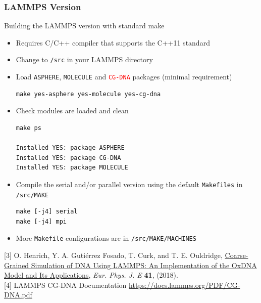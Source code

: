 \documentclass[slidestop,compress,9pt]{beamer}
\begin{document}
\begin{frame}[fragile]
\frametitle{LAMMPS Version}
\small Building the LAMMPS version with standard make
\begin{itemize}
\item Requires C/C++ compiler that supports the C++11 standard
\item Change to \texttt{/src} in your LAMMPS directory
\item Load \texttt{ASPHERE}, \texttt{MOLECULE} and \texttt{\textcolor{red}{CG-DNA}} packages (minimal requirement)\\
\linespread{0.4}
\begin{lstlisting}
make yes-asphere yes-molecule yes-cg-dna
\end{lstlisting}
\item Check modules are loaded and clean

\begin{lstlisting}
make ps

Installed YES: package ASPHERE
Installed YES: package CG-DNA
Installed YES: package MOLECULE
\end{lstlisting}

\item Compile the serial and/or parallel version using the default \texttt{Makefiles} in \texttt{/src/MAKE}
\begin{lstlisting}
make [-j4] serial
make [-j4] mpi
\end{lstlisting}
\item More \texttt{Makefile} configurations are in \texttt{/src/MAKE/MACHINES}
\end{itemize}
\linespread{1.0}\vspace*{0.25cm}
[3] O. Henrich, Y. A. Guti\'errez Fosado, T. Curk, and T. E. Ouldridge, \href{https://doi.org/10.1140/epje/i2018-11669-8}{Coarse-Grained Simulation of DNA Using LAMMPS: An Implementation of the OxDNA Model and Its Applications}, \textit{Eur. Phys. J. E} \textbf{41}, (2018).\\[3pt]
[4] LAMMPS CG-DNA Documentation \href{https://docs.lammps.org/PDF/CG-DNA.pdf}{https://docs.lammps.org/PDF/CG-DNA.pdf}
\end{frame}
\end{document}
